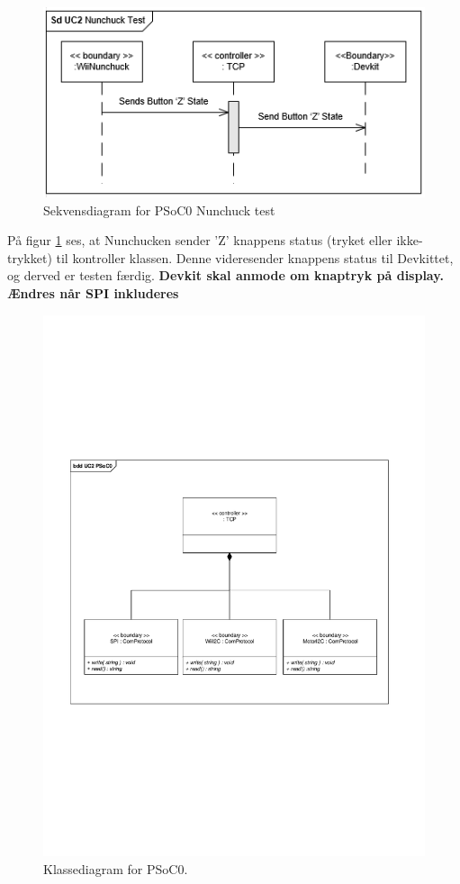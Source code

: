 \begin{figure}[H]
	\centering
	\includegraphics[width=\textwidth] {Systemarkitektur/images/SDPSoC0NunchuckTest}
	\caption{Sekvensdiagram for PSoC0 Nunchuck test}
	\label{fig:sekvensPSoC0NunchuckTest}
\end{figure}

På figur \ref{fig:sekvensPSoC0NunchuckTest} ses, at Nunchucken sender 'Z' knappens status (tryket eller ikke-trykket) til kontroller klassen. Denne videresender knappens status til Devkittet, og derved er testen færdig. \textbf{Devkit skal anmode om knaptryk på display. Ændres når SPI inkluderes}\newline

\begin{figure}[H]
	\centering
	\includegraphics[width=\textwidth]{Systemarkitektur/images/klassediagramPSoC0}
	\caption{Klassediagram for PSoC0.}
	\label{fig:klassePSoC0}
\end{figure}

